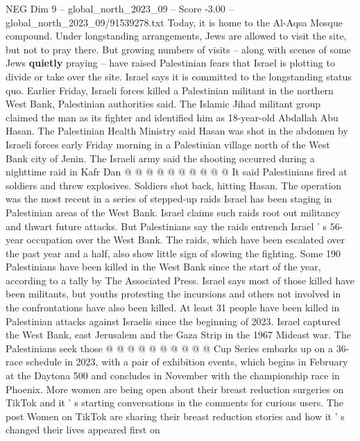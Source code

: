 \begin{textsample}{NEG Dim 9 – global\_north\_2023\_09 – Score -3.00 – global\_north\_2023\_09/91539278.txt}
Today, it is home to the Al-Aqsa Mosque compound.
Under longstanding arrangements, Jews are allowed to visit the site, but not to pray there.
But growing numbers of visits -- along with scenes of some Jews \textbf{quietly} praying -- have raised Palestinian fears that Israel is plotting to divide or take over the site.
Israel says it is committed to the longstanding status quo.
Earlier Friday, Israeli forces killed a Palestinian militant in the northern West Bank, Palestinian authorities said.
The Islamic Jihad militant group claimed the man as its fighter and identified him as 18-year-old Abdallah Abu Hasan.
The Palestinian Health Ministry said Hasan was shot in the abdomen by Israeli forces early Friday morning in a Palestinian village north of the West Bank city of Jenin.
The Israeli army said the shooting occurred during a nighttime raid in Kafr Dan @ @ @ @ @ @ @ @ @ @ It said Palestinians fired at soldiers and threw explosives.
Soldiers shot back, hitting Hasan.
The operation was the most recent in a series of stepped-up raids Israel has been staging in Palestinian areas of the West Bank.
Israel claims such raids root out militancy and thwart future attacks.
But Palestinians say the raids entrench Israel ' s 56-year occupation over the West Bank.
The raids, which have been escalated over the past year and a half, also show little sign of slowing the fighting.
Some 190 Palestinians have been killed in the West Bank since the start of the year, according to a tally by The Associated Press.
Israel says most of those killed have been militants, but youths protesting the incursions and others not involved in the confrontations have also been killed.
At least 31 people have been killed in Palestinian attacks against Israelis since the beginning of 2023.
Israel captured the West Bank, east Jerusalem and the Gaza Strip in the 1967 Mideast war.
The Palestinians seek those @ @ @ @ @ @ @ @ @ @ Cup Series embarks up on a 36-race schedule in 2023, with a pair of exhibition events, which begins in February at the Daytona 500 and concludes in November with the championship race in Phoenix.
More women are being open about their breast reduction surgeries on TikTok and it ' s starting conversations in the comments for curious users.
The post Women on TikTok are sharing their breast reduction stories and how it ' s changed their lives appeared first on

\end{textsample}
